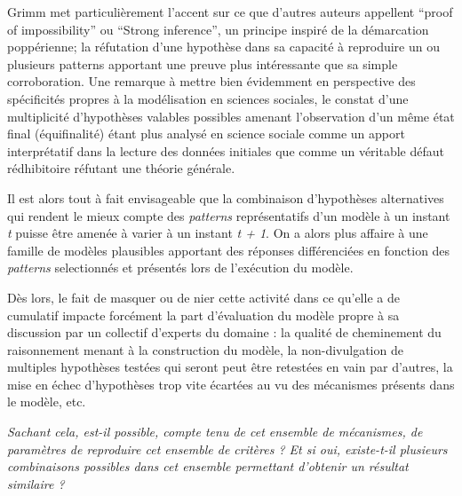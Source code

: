 Grimm met particulièrement l'accent sur ce que d'autres auteurs appellent \foreignquote{english}{proof of impossibility} \autocites{Cottineau2014b, Hedstrom2010} ou \foreignquote{english}{Strong inference}, un principe inspiré de la démarcation poppérienne; la réfutation d'une hypothèse dans sa capacité à reproduire un ou plusieurs patterns apportant une preuve plus intéressante que sa simple corroboration. Une remarque à mettre bien évidemment en perspective des spécificités propres à la modélisation en sciences sociales, le constat d'une multiplicité d'hypothèses valables possibles amenant l'observation d'un même état final (équifinalité) étant plus analysé en science sociale comme un apport interprétatif dans la lecture des données initiales que comme un véritable défaut rédhibitoire réfutant une théorie générale. 

Il est alors tout à fait envisageable que la combinaison d'hypothèses alternatives qui rendent le mieux compte des \textit{patterns} représentatifs d'un modèle à un instant \textit{t} puisse être amenée à varier à un instant \textit{t + 1}. On a alors plus affaire à une famille de modèles plausibles apportant des réponses différenciées en fonction des \textit{patterns} selectionnés et présentés lors de l'exécution du modèle.

Dès lors, le fait de masquer ou de nier cette activité dans ce qu'elle a de cumulatif impacte forcément la part d'évaluation du modèle propre à sa discussion par un collectif d'experts du domaine : la qualité de cheminement du raisonnement menant à la construction du modèle, la non-divulgation de multiples hypothèses testées qui seront peut être retestées en vain par d'autres, la mise en échec d'hypothèses trop vite écartées au vu des mécanismes présents dans le modèle, etc.



\textit{Sachant cela, est-il possible, compte tenu de cet ensemble de mécanismes, de paramètres de reproduire cet ensemble de critères ? Et si oui, existe-t-il plusieurs combinaisons possibles dans cet ensemble permettant d'obtenir un résultat similaire ?}

